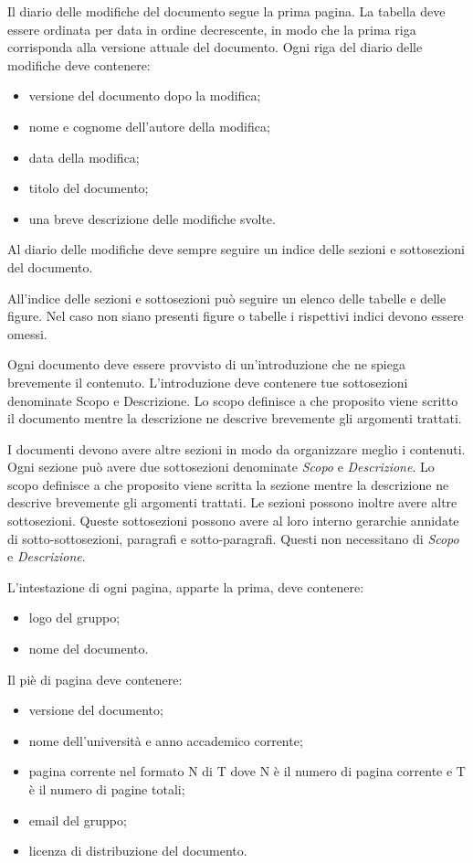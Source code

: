 \documentclass[12pt,a4paper]{article}
\begin{document}
Il diario delle modifiche del documento segue la prima pagina. La tabella deve essere ordinata per data in ordine decrescente, in modo che la prima riga corrisponda alla versione attuale del documento. Ogni riga del diario delle modifiche deve contenere:
\begin{itemize}
	\item versione del documento dopo la modifica;
	\item nome e cognome dell'autore della modifica;
	\item data della modifica;
	\item titolo del documento;
	\item una breve descrizione delle modifiche svolte.
\end{itemize}

Al diario delle modifiche deve sempre seguire un indice delle sezioni e sottosezioni del documento.

All'indice delle sezioni e sottosezioni può seguire un elenco delle tabelle e delle figure. Nel caso non siano presenti figure o tabelle i rispettivi indici devono essere omessi.

Ogni documento deve essere provvisto di un'introduzione che ne spiega brevemente il contenuto. L'introduzione deve contenere tue sottosezioni denominate Scopo e Descrizione. Lo scopo definisce a che proposito viene scritto il documento mentre la descrizione ne descrive brevemente gli argomenti trattati.

I documenti devono avere altre sezioni in modo da organizzare meglio i contenuti. Ogni sezione può avere due sottosezioni denominate \textit{Scopo} e \textit{Descrizione}. Lo scopo definisce a che proposito viene scritta la sezione mentre la descrizione ne descrive brevemente gli argomenti trattati. Le sezioni possono inoltre avere altre sottosezioni. Queste sottosezioni possono avere al loro interno gerarchie annidate di sotto-sottosezioni,  paragrafi e sotto-paragrafi. Questi non necessitano di \textit{Scopo} e \textit{Descrizione}.

L'intestazione di ogni pagina, apparte la prima, deve contenere:
\begin{itemize}
	\item logo del gruppo;
	\item nome del documento.
\end{itemize}
Il piè di pagina deve contenere:
\begin{itemize}
	\item versione del documento;
	\item nome dell'università e anno accademico corrente;
	\item pagina corrente nel formato N di T dove N è il numero di pagina corrente e T è il numero di pagine totali;
	\item email del gruppo;
	\item licenza di distribuzione del documento.
\end{itemize}
\end{document}
